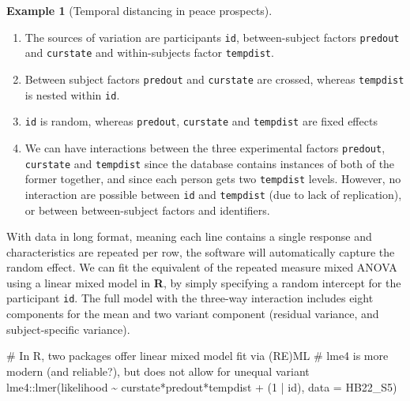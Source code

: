 \documentclass[
  11pt,
  letterpaper,
]{scrbook}
\newenvironment{Shaded}{\begin{snugshade}}{\end{snugshade}}
\newcommand{\AttributeTok}[1]{\textcolor[rgb]{0.40,0.45,0.13}{#1}}
\newcommand{\CommentTok}[1]{\textcolor[rgb]{0.37,0.37,0.37}{#1}}
\newcommand{\DecValTok}[1]{\textcolor[rgb]{0.68,0.00,0.00}{#1}}
\newcommand{\FunctionTok}[1]{\textcolor[rgb]{0.28,0.35,0.67}{#1}}
\newcommand{\NormalTok}[1]{\textcolor[rgb]{0.00,0.23,0.31}{#1}}
\newcommand{\SpecialCharTok}[1]{\textcolor[rgb]{0.37,0.37,0.37}{#1}}
\providecommand{\tightlist}{%
  \setlength{\itemsep}{0pt}\setlength{\parskip}{0pt}}\usepackage{longtable,booktabs,array}
\theoremstyle{definition}
\newtheorem{example}{Example}[chapter]
\theoremstyle{remark}
\begin{document}
\begin{example}[Temporal distancing in peace
prospects]
\begin{enumerate}
\def\labelenumi{\arabic{enumi}.}
\tightlist
\item
  The sources of variation are participants \texttt{id}, between-subject
  factors \texttt{predout} and \texttt{curstate} and within-subjects
  factor \texttt{tempdist}.
\item
  Between subject factors \texttt{predout} and \texttt{curstate} are
  crossed, whereas \texttt{tempdist} is nested within \texttt{id}.
\item
  \texttt{id} is random, whereas \texttt{predout}, \texttt{curstate} and
  \texttt{tempdist} are fixed effects
\item
  We can have interactions between the three experimental factors
  \texttt{predout}, \texttt{curstate} and \texttt{tempdist} since the
  database contains instances of both of the former together, and since
  each person gets two \texttt{tempdist} levels. However, no interaction
  are possible between \texttt{id} and \texttt{tempdist} (due to lack of
  replication), or between between-subject factors and identifiers.
\end{enumerate}

With data in long format, meaning each line contains a single response
and characteristics are repeated per row, the software will
automatically capture the random effect. We can fit the equivalent of
the repeated measure mixed ANOVA using a linear mixed model in
\textbf{R}, by simply specifying a random intercept for the participant
\texttt{id}. The full model with the three-way interaction includes
eight components for the mean and two variant component (residual
variance, and subject-specific variance).

\begin{Shaded}
\begin{Highlighting}[]
\CommentTok{\# In R, two packages offer linear mixed model fit via (RE)ML}
\CommentTok{\# lme4 is more modern (and reliable?), but does not allow for unequal variant}
\NormalTok{lme4}\SpecialCharTok{::}\FunctionTok{lmer}\NormalTok{(likelihood }\SpecialCharTok{\textasciitilde{}}\NormalTok{ curstate}\SpecialCharTok{*}\NormalTok{predout}\SpecialCharTok{*}\NormalTok{tempdist }\SpecialCharTok{+}\NormalTok{ (}\DecValTok{1} \SpecialCharTok{|}\NormalTok{ id),}
     \AttributeTok{data =}\NormalTok{ HB22\_S5)}
\end{Highlighting}
\end{Shaded}


\end{example}
\end{document}
